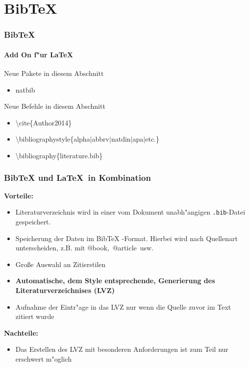 \section{BibTeX}
\begin{frame}
\frametitle{BibTeX}
\framesubtitle{Add On f"ur \LaTeX}
\begin{exampleblock}{Neue Pakete in diesem Abschnitt}
\begin{itemize}
\item natbib
\end{itemize}
\end{exampleblock}

\begin{block}{Neue Befehle in diesem Abschnitt}
\begin{itemize}
\item \color{nounibaredI}\textbackslash cite\color{black}\{Author2014\}
\item \color{nounibaredI}\textbackslash bibliographystyle\color{black}\{alpha$\mid$abbrv$\mid$natdin$\mid$apa$\mid$etc.\}
\item \color{nounibaredI}\textbackslash bibliography\color{black}\{literature.bib\}
\end{itemize}
\end{block}
\end{frame}

\begin{frame}
\frametitle{BibTeX und \LaTeX ~in Kombination}
\textbf{Vorteile:}
\begin{itemize}
\item Literaturverzeichnis wird in einer vom Dokument unabh"angigen \texttt{.bib}-Datei gespeichert.
\item Speicherung der Daten im BibTeX -Format. Hierbei wird nach Quellenart unterscheiden, z.B. mit \color{nounibaredI}$@$book\color{black},~\color{nounibaredI}$@$article\color{black}~usw.
\item Gro\ss e Auswahl an Zitierstilen
\item \textbf{Automatische, dem Style entsprechende, Generierung des Literaturverzeichnises (LVZ)}
\item Aufnahme der Eintr"age in das LVZ nur wenn die Quelle zuvor im Text zitiert wurde
\end{itemize}
\textbf{Nachteile:}
\begin{itemize}
\item Das Erstellen des LVZ mit besonderen Anforderungen ist zum Teil nur erschwert m"oglich
\end{itemize}
\end{frame}

